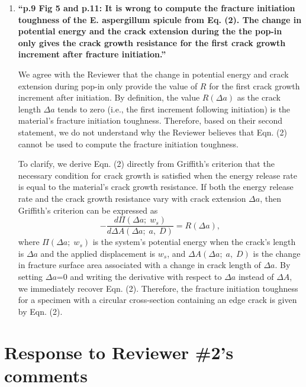 \documentclass[11pt,letterpaper]{report}
\begin{document}
\begin{enumerate}[label=\textit{1.\arabic*},wide, labelwidth=!, labelindent=0pt]
\item \label{r1c8} {\bf ``p.9 Fig 5 and p.11: It is wrong to compute the fracture initiation toughness of the E. aspergillum spicule from Eq. (2). The change in potential energy and the crack extension during the the pop-in only gives the crack growth resistance for the first crack growth increment after fracture initiation.''}

We agree with the Reviewer that the change in potential energy and crack extension during pop-in only provide the value of $R$ for the first crack growth increment after initiation. By definition, the value $R(\Delta a)$ as the crack length $\Delta a$ tends to zero (i.e., the first increment following initiation) is the material's fracture initiation toughness. Therefore, based on their second statement, we do not understand why the Reviewer believes that Eqn. (2) cannot be used to compute the fracture initiation toughness.

To clarify, we derive Eqn. (2) directly from Griffith's criterion that the necessary condition for crack growth is satisfied when the energy release rate is equal to the material's crack growth resistance. If both the energy release rate and the crack growth resistance vary with crack extension $\Delta a$, then Griffith's criterion can be expressed as
%
\[-\frac{d \Pi (\Delta a;\; w_s)}{d\Delta A(\Delta a;\; a,\;D)}=R(\Delta a),\]
%
where $\Pi(\Delta a;\;w_s)$ is the system's potential energy when the crack's length is $\Delta a$ and the applied displacement is $w_s$, and $\Delta A(\Delta a;\; a,\;D)$ is the change in fracture surface area associated with a change in crack length of $\Delta a$. By setting $\Delta a$=0 and writing the derivative with respect to $\Delta a$ instead of $\Delta A$, we immediately recover Eqn. (2). Therefore, the fracture initiation toughness for a specimen with a circular cross-section containing an edge crack is given by Eqn. (2).


\end{enumerate}

\clearpage
\section*{Response to Reviewer \#2's comments}
\label{rev2}
\end{document}
